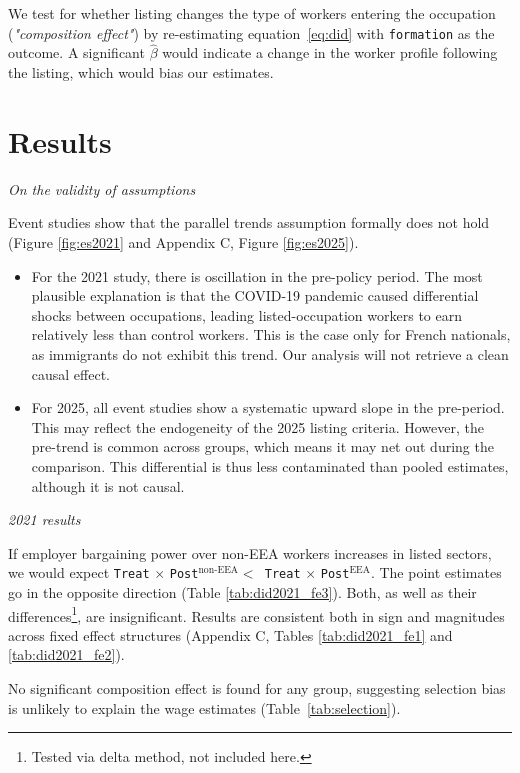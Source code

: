 \documentclass[10pt, a4paper]{article}
\begin{document}
\noindent We test for whether listing changes the type of workers entering the occupation (\textit{"composition effect"}) by re-estimating  equation~\eqref{eq:did} with \texttt{formation} as the outcome. A significant $\hat\beta$ would indicate a change in the worker profile following the listing, which would bias our estimates.  
\medskip

\section{Results}
\medskip

\noindent \textit{On the validity of assumptions}

\noindent Event studies show that the parallel trends assumption formally does not hold (Figure \ref{fig:es2021} and Appendix C, Figure \ref{fig:es2025}).
\begin{itemize}
    \item For the 2021 study, there is oscillation in the pre-policy period. The most plausible explanation is that the COVID-19 pandemic caused differential shocks between occupations, leading listed-occupation workers to earn relatively less than control workers. This is the case only for French nationals, as immigrants do not exhibit this trend. Our analysis will not retrieve a clean causal effect. \smallskip
    \item For 2025, all event studies show a systematic upward slope in the pre-period. This may reflect the endogeneity of the 2025 listing criteria. However, the pre-trend is common across groups, which means it may net out during the comparison. This differential is thus less contaminated than pooled estimates, although it is not causal.
\end{itemize}
\medskip

\noindent \textit{2021 results}
\smallskip

\noindent If employer bargaining power over non-EEA workers increases in listed sectors, we would expect \texttt{Treat$\,\times\,$Post$^{\text{non-EEA}} <$ Treat$\,\times\,$Post$^{\text{EEA}}$}. The point estimates go in the opposite direction (Table \ref{tab:did2021_fe3}). Both, as well as their differences\footnote{Tested via delta method, not included here.}, are insignificant. Results are consistent both in sign and magnitudes across fixed effect structures (Appendix C, Tables \ref{tab:did2021_fe1} and \ref{tab:did2021_fe2}).

\noindent No significant composition effect is found for any group, suggesting selection bias is unlikely to explain the wage estimates (Table~\ref{tab:selection}).
\medskip 
\end{document}
